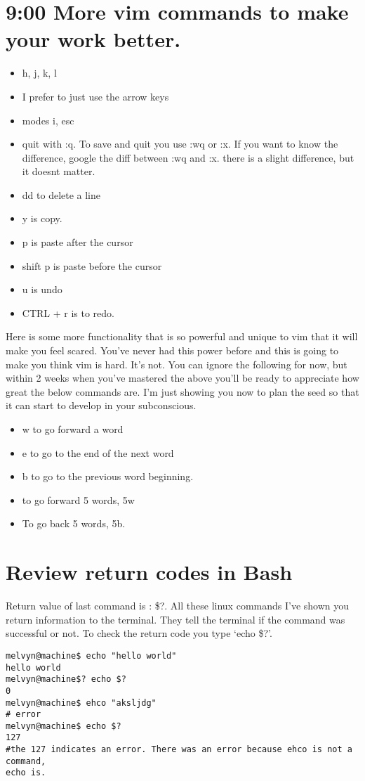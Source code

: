 \documentclass[10pt]{article}
\begin{document}
\section*{ 9:00 More vim commands to make your work better.}
\begin{itemize}
\item h, j, k, l
\item I prefer to just use the arrow keys
\item modes i, esc
\item quit with :q. To save and quit you use :wq or :x. If you want to know the difference, google the diff between :wq and :x. there is a slight difference, but it doesnt matter.
\item dd to delete a line
\item y is copy.
\item p is paste after the cursor
\item shift p is paste before the cursor
\item u is undo
\item CTRL + r is to redo.
\end{itemize}

Here is some more functionality that is so powerful and unique to vim that it
will make you feel scared. You've never had this power before and this is going
to make you think vim is hard. It's not. You can ignore the following for now,
but within 2 weeks when you've mastered the above you'll be ready to appreciate
how great the below commands are. I'm just showing you now to plan the seed so
that it can start to develop in your subconscious.

\begin{itemize}
\item w to go forward a word
\item e to go to the end of the next word
\item b to go to the previous word beginning.
\item to go forward 5 words, 5w
\item To go back 5 words, 5b.
\end{itemize}


\section*{ Review return codes in Bash }

Return value of last command is : \$?. All these linux commands I've shown you
return information to the terminal. They tell the terminal if the command was
successful or not. To check the return code you type `echo \$?'.

\begin{lstlisting}[style=term]
melvyn@machine$ echo "hello world"
hello world 
melvyn@machine$? echo $?
0
melvyn@machine$ ehco "aksljdg"
# error
melvyn@machine$ echo $?
127
#the 127 indicates an error. There was an error because ehco is not a command,
echo is.
\end{lstlisting}
\end{document}
